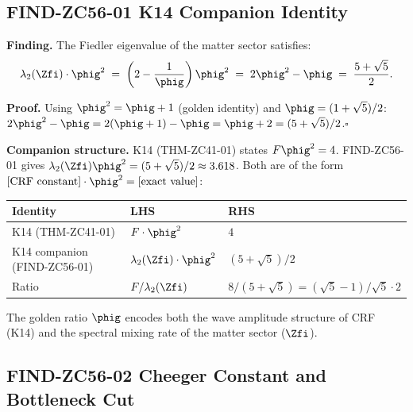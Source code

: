 \documentclass[12pt, a4paper]{article}
\begin{document}
\subsection{FIND-ZC56-01 \quad K14 Companion Identity}
\label{sec:find01}


\begin{derivedbox}[title={FIND-ZC56-01: $\lambda_2(\Zfi)\cdot\phig^2
  = (5+\sqrt{5})/2$ --- Companion to K14 ($R_0$, Exact)}]
\textbf{Finding.}
The Fiedler eigenvalue of the matter sector satisfies:
\begin{equation}
  \lambda_2(\Zfi)\cdot\phig^2
  \;=\; \left(2-\frac{1}{\phig}\right)\phig^2
  \;=\; 2\phig^2 - \phig
  \;=\; \frac{5+\sqrt{5}}{2}.
  \label{eq:companion-K14}
\end{equation}

\textbf{Proof.}
Using $\phig^2=\phig+1$ (golden identity) and $\phig=(1+\sqrt{5})/2$:
$2\phig^2-\phig=2(\phig+1)-\phig=\phig+2=(5+\sqrt{5})/2$.\hfill$\square$

\medskip
\textbf{Companion structure.}
K14 (THM-ZC41-01) states $F\phig^2=4$.
FIND-ZC56-01 gives $\lambda_2(\Zfi)\phig^2=(5+\sqrt{5})/2\approx3.618$.
Both are of the form $[\text{CRF constant}]\cdot\phig^2=[\text{exact value}]$:
\begin{center}
\begin{tabular}{@{}lll@{}}
\toprule
Identity & LHS & RHS \\
\midrule
K14 (THM-ZC41-01) & $F\cdot\phig^2$ & $4$ \\
K14 companion (FIND-ZC56-01) & $\lambda_2(\Zfi)\cdot\phig^2$ & $(5+\sqrt{5})/2$ \\
\midrule
Ratio & $F/\lambda_2(\Zfi)$ & $8/(5+\sqrt{5})=(\sqrt{5}-1)/\sqrt{5}\cdot 2$ \\
\bottomrule
\end{tabular}
\end{center}
\medskip
The golden ratio $\phig$ encodes both the wave amplitude
structure of CRF (K14) and the spectral mixing rate of the
matter sector ($\Zfi$).
\end{derivedbox}

\subsection{FIND-ZC56-02 \quad Cheeger Constant and Bottleneck Cut}
\label{sec:find02}
\end{document}
